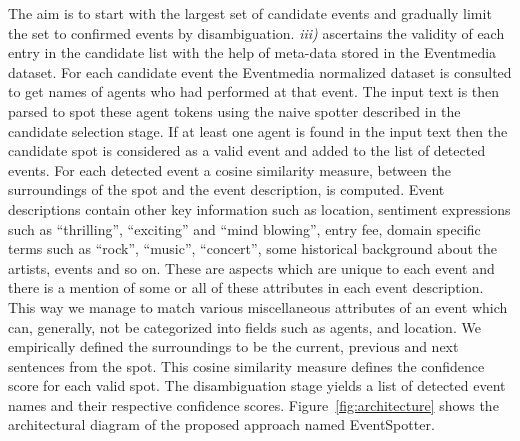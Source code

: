 \documentclass[10pt,a4paper]{article}
\begin{document}
The aim is to start with the largest set of candidate events and gradually limit the set to confirmed events by disambiguation. 
\textit{iii)} ascertains the validity of each entry in the candidate list with the help of meta-data stored in the Eventmedia dataset. 
For each candidate event the Eventmedia normalized dataset is consulted to get names of agents who had performed at that event. The input text is then parsed to spot these agent tokens using the naive spotter described in the candidate selection stage. If at least one agent is found in the input text then the candidate spot is considered as a valid event and added to the list of detected events. For each detected event a cosine similarity measure,  between the surroundings of the spot and the event description, is computed. Event descriptions contain other key information such as location, sentiment expressions such as ``thrilling'', ``exciting'' and ``mind blowing'', entry fee, domain specific terms such as ``rock'', ``music'', ``concert'', some historical background about the artists, events and so on. These are aspects which are unique to each event and there is a mention of some or all of these attributes in each event description. This way we manage to match various miscellaneous attributes of an event which can, generally, not be categorized into fields such as agents, and location. We empirically defined the surroundings to be the current, previous and next sentences from the spot. This cosine similarity measure defines the confidence score for each valid spot. The disambiguation stage yields a list of detected event names and their respective confidence scores.
Figure~\ref{fig:architecture} shows the architectural diagram of the proposed approach named EventSpotter. 
\end{document}
